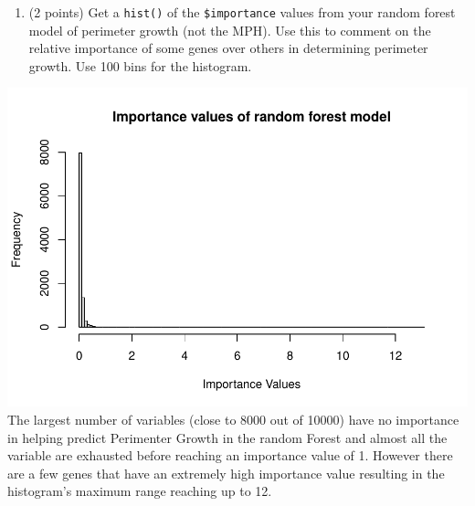 \documentclass[
]{article}
\newenvironment{Shaded}{\begin{snugshade}}{\end{snugshade}}
\newcommand{\AttributeTok}[1]{\textcolor[rgb]{0.13,0.29,0.53}{#1}}
\newcommand{\ConstantTok}[1]{\textcolor[rgb]{0.56,0.35,0.01}{#1}}
\newcommand{\DecValTok}[1]{\textcolor[rgb]{0.00,0.00,0.81}{#1}}
\newcommand{\FunctionTok}[1]{\textcolor[rgb]{0.13,0.29,0.53}{\textbf{#1}}}
\newcommand{\NormalTok}[1]{#1}
\newcommand{\SpecialCharTok}[1]{\textcolor[rgb]{0.81,0.36,0.00}{\textbf{#1}}}
\newcommand{\StringTok}[1]{\textcolor[rgb]{0.31,0.60,0.02}{#1}}
\providecommand{\tightlist}{%
  \setlength{\itemsep}{0pt}\setlength{\parskip}{0pt}}
\begin{document}
\newpage

\begin{enumerate}
\def\labelenumi{\arabic{enumi}.}
\setcounter{enumi}{1}
\tightlist
\item
  (2 points) Get a \texttt{hist()} of the \texttt{\$importance} values
  from your random forest model of perimeter growth (not the MPH). Use
  this to comment on the relative importance of some genes over others
  in determining perimeter growth. Use 100 bins for the histogram.
\end{enumerate}

\begin{Shaded}
\end{Shaded}

\includegraphics{STAT847_A2_Cbverghe_files/figure-latex/unnamed-chunk-3-1.pdf}
The largest number of variables (close to 8000 out of 10000) have no
importance in helping predict Perimenter Growth in the random Forest and
almost all the variable are exhausted before reaching an importance
value of 1. However there are a few genes that have an extremely high
importance value resulting in the histogram's maximum range reaching up
to 12.
\end{document}
